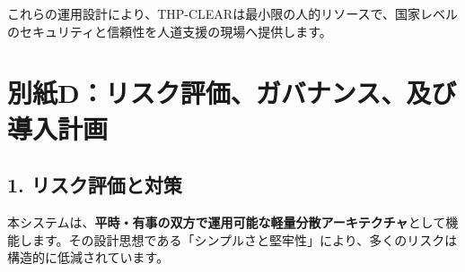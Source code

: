 \documentclass[
  a4paper,
  ja=standard,
  xelatex]{bxjsarticle}
\begin{document}
これらの運用設計により、THP-CLEARは最小限の人的リソースで、国家レベルのセキュリティと信頼性を人道支援の現場へ提供します。

\section{\texorpdfstring{\textbf{別紙D：リスク評価、ガバナンス、及び導入計画}}{別紙D：リスク評価、ガバナンス、及び導入計画}}\label{ux5225ux7d19dux30eaux30b9ux30afux8a55ux4fa1ux30acux30d0ux30caux30f3ux30b9ux53caux3073ux5c0eux5165ux8a08ux753b}

\subsection{\texorpdfstring{\textbf{1.
リスク評価と対策}}{1. リスク評価と対策}}\label{ux30eaux30b9ux30afux8a55ux4fa1ux3068ux5bfeux7b56}

本システムは、\textbf{平時・有事の双方で運用可能な軽量分散アーキテクチャ}として機能します。その設計思想である「シンプルさと堅牢性」により、多くのリスクは構造的に低減されています。
\end{document}
